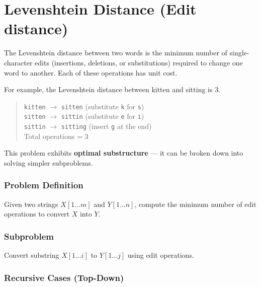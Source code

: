 \documentclass{article}
\begin{document}
\section{Levenshtein Distance (Edit distance)}



The Levenshtein distance between two words is the minimum number of single-character edits 
(insertions, deletions, or substitutions) required to change one word to another. Each of these operations has unit cost.

For example, the Levenshtein distance between kitten and sitting is 3. 

\begin{quote}
\texttt{kitten} $\rightarrow$ \texttt{sitten} \hfill (substitute \texttt{k} for \texttt{s}) \\
\texttt{sitten} $\rightarrow$ \texttt{sittin} \hfill (substitute \texttt{e} for \texttt{i}) \\
\texttt{sittin} $\rightarrow$ \texttt{sitting} \hfill (insert \texttt{g} at the end) \\
Total operations = 3
\end{quote}

This problem exhibits \textbf{optimal substructure} — it can be broken down into solving simpler subproblems.

\subsubsection*{Problem Definition}
Given two strings $X[1 \ldots m]$ and $Y[1 \ldots n]$, compute the minimum number of edit operations to convert $X$ into $Y$.

\subsubsection*{Subproblem}
Convert substring $X[1 \ldots i]$ to $Y[1 \ldots j]$ using edit operations.

\subsubsection*{Recursive Cases (Top-Down)}
\end{document}
